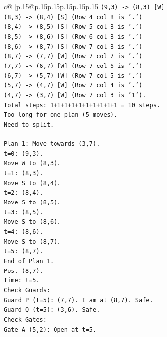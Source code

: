 \documentclass{article}
\begin{document}
{\begin{supertabular}{c@{$\;$}|p{.15\linewidth}@{}p{.15\linewidth}p{.15\linewidth}p{.15\linewidth}p{.15\linewidth}p{.15\linewidth}}
{{{\texttt{(9,3) {-}> (8,3) {[}W{]}} \\
\texttt{(8,3) {-}> (8,4) {[}S{]} (Row 4 col 8 is '.')} \\
\texttt{(8,4) {-}> (8,5) {[}S{]} (Row 5 col 8 is '.')} \\
\texttt{(8,5) {-}> (8,6) {[}S{]} (Row 6 col 8 is '.')} \\
\texttt{(8,6) {-}> (8,7) {[}S{]} (Row 7 col 8 is '.')} \\
\texttt{(8,7) {-}> (7,7) {[}W{]} (Row 7 col 7 is '.')} \\
\texttt{(7,7) {-}> (6,7) {[}W{]} (Row 7 col 6 is '.')} \\
\texttt{(6,7) {-}> (5,7) {[}W{]} (Row 7 col 5 is '.')} \\
\texttt{(5,7) {-}> (4,7) {[}W{]} (Row 7 col 4 is '.')} \\
\texttt{(4,7) {-}> (3,7) {[}W{]} (Row 7 col 3 is '1').} \\
\texttt{Total steps: 1+1+1+1+1+1+1+1+1+1 = 10 steps.} \\
\texttt{Too long for one plan (5 moves).} \\
\texttt{Need to split.} \\
\\ 
\texttt{Plan 1: Move towards (3,7).} \\
\texttt{t=0: (9,3).} \\
\texttt{Move W to (8,3).} \\
\texttt{t=1: (8,3).} \\
\texttt{Move S to (8,4).} \\
\texttt{t=2: (8,4).} \\
\texttt{Move S to (8,5).} \\
\texttt{t=3: (8,5).} \\
\texttt{Move S to (8,6).} \\
\texttt{t=4: (8,6).} \\
\texttt{Move S to (8,7).} \\
\texttt{t=5: (8,7).} \\
\texttt{End of Plan 1.} \\
\texttt{Pos: (8,7).} \\
\texttt{Time: t=5.} \\
\texttt{Check Guards:} \\
\texttt{Guard P (t=5): (7,7). I am at (8,7). Safe.} \\
\texttt{Guard Q (t=5): (3,6). Safe.} \\
\texttt{Check Gates:} \\
\texttt{Gate A (5,2): Open at t=5.} \\
}}}
\end{supertabular}}
\end{document}
